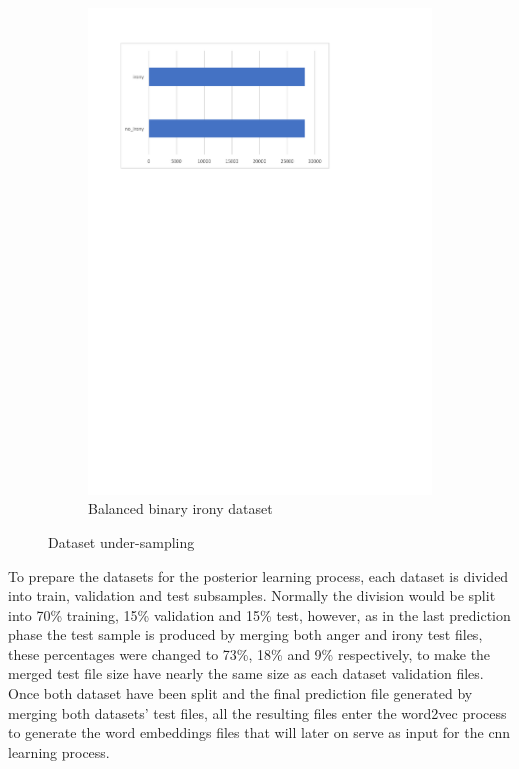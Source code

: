\begin{figure}[!htp]
\begin{subfigure}[b]{0.5\textwidth}
    \includegraphics[width=\linewidth]{figures/binary_irony_dataset_distribution}
    \caption{Balanced binary irony dataset}
    \label{fig:binary_irony_dataset_distribution}
  \end{subfigure}%
  \caption{Dataset under-sampling}\label{fig:dataset_undersampling}
\end{figure}

To prepare the datasets for the posterior learning process, each dataset is divided into train, validation and test subsamples. Normally the division would be split into 70\% training, 15\% validation and 15\% test, however, as in the last prediction phase the test sample is produced by merging both anger and irony test files, these percentages were changed to 73\%, 18\% and 9\% respectively, to make the merged test file size have nearly the same size as each dataset validation files. Once both dataset have been split and the final prediction file generated by merging both datasets' test files, all the resulting files enter the word2vec process to generate the word embeddings files that will later on serve as input for the \acrshort{cnn} learning process.


